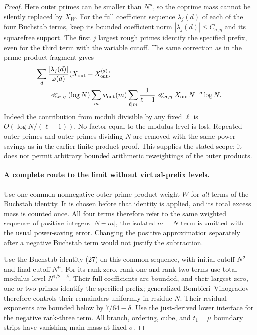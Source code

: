 \documentclass[11pt]{article}
\begin{document}
\begin{proof}
Here outer primes can be smaller than $N^\mu$, so the coprime
mass cannot be silently replaced by $X_W$. For the full
coefficient sequence $\lambda_j(d)$ of each of the four
Buchstab terms, keep its bounded coefficient norm
$|\lambda_j(d)|\le C_{\sigma,\eta}$ and its squarefree support.
The first $j$ largest rough primes identify the specified
prefix, even for the third term with the variable cutoff.
The same correction as in the prime-product fragment gives
\begin{align*}
 &\sum_d\frac{|\lambda_j(d)|}{\varphi(d)}
                       (X_{\rm out}-X_{\rm out}^{(d)})\\
 &\qquad\ll_{\sigma,\eta}(\log N)
       \sum_mw_{\rm out}(m)\sum_{\ell\mid m}\frac1{\ell-1}
 \ll_{\sigma,\eta}X_{\rm out}N^{-a}\log N.
\end{align*}
Indeed the contribution from moduli divisible by any fixed
$\ell$ is $O(\log N/(\ell-1))$. No factor equal to the
modulus level is lost. Repeated outer primes and outer primes
dividing $N$ are removed with the same power savings as in
the earlier finite-product proof. This supplies the stated
scope; it does not permit arbitrary bounded arithmetic
reweightings of the outer products.

\paragraph{A complete route to the limit without virtual-prefix levels.}
Use one common nonnegative outer prime-product weight $W$ for
\emph{all} terms of the Buchstab identity. It is chosen before
that identity is applied, and its total excess mass is counted
once. All four terms therefore refer to the same weighted
sequence of positive integers $|N-m|$; the isolated $m=N$
term is omitted with the usual power-saving error. Changing
the positive approximation separately after a negative
Buchstab term would not justify the subtraction.

Use the Buchstab identity (27) on this common sequence,
with initial cutoff $N^\sigma$ and final cutoff $N^\mu$.
For its rank-zero, rank-one and rank-two terms use total modulus
level $N^{1/2-\delta}$. Their full coefficients are bounded,
and their largest zero, one or two primes identify the specified
prefix; generalized Bombieri--Vinogradov therefore controls
their remainders uniformly in residue $N$.
Their residual exponents are bounded below by $7/64-\delta$.
Use the just-derived lower interface for the negative rank-three
term. All branch, ordering, cube, and $t_1=\mu$ boundary strips
have vanishing main mass at fixed $\sigma$.


\end{proof}
\end{document}
